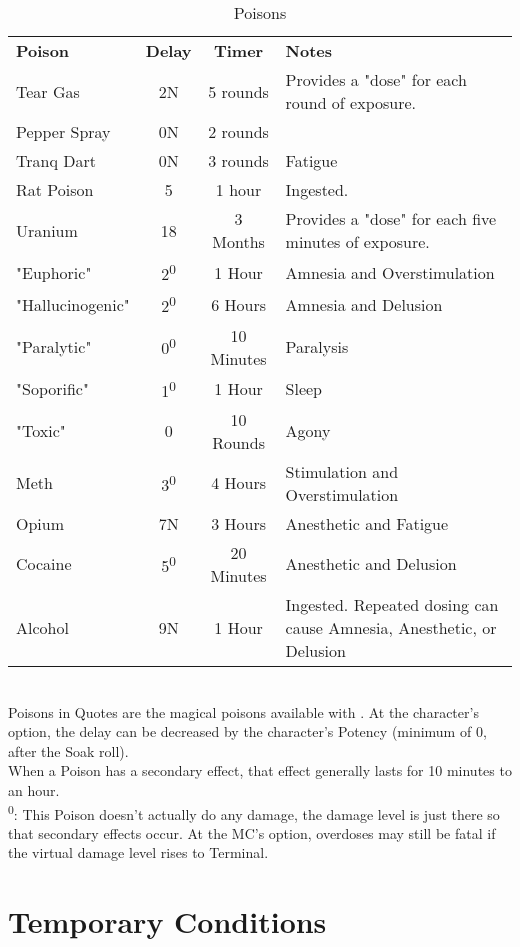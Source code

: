 \begin{table}[htb] 
\caption{Poisons} \raggedright
\begin{tabular}{l c c p{8cm}}
\textbf{Poison} & \textbf{Delay} & \textbf{Timer} & \textbf{Notes}\\
Tear Gas & 2N & 5 rounds & Provides a "dose" for each round of exposure.\\
Pepper Spray & 0N & 2 rounds & \\
Tranq Dart & 0N & 3 rounds & Fatigue\\
Rat Poison & 5 & 1 hour & Ingested.\\
Uranium & 18 & 3 Months & Provides a "dose" for each five minutes of exposure.\\
"Euphoric" & 2\textsuperscript{0} & 1 Hour & Amnesia and Overstimulation\\
"Hallucinogenic" & 2\textsuperscript{0} & 6 Hours & Amnesia and Delusion\\
"Paralytic" & 0\textsuperscript{0} & 10 Minutes & Paralysis\\
"Soporific" & 1\textsuperscript{0} & 1 Hour & Sleep\\
"Toxic" & 0 & 10 Rounds & Agony\\
Meth & 3\textsuperscript{0} & 4 Hours & Stimulation and Overstimulation\\
Opium & 7N & 3 Hours & Anesthetic and Fatigue\\
Cocaine & 5\textsuperscript{0} & 20 Minutes & Anesthetic and Delusion\\
Alcohol & 9N & 1 Hour & Ingested. Repeated dosing can cause Amnesia, Anesthetic, or Delusion\\
\end{tabular}\\
\textbullet{}Poisons in Quotes are the magical poisons available with . At the character's option, the delay can be decreased by the character's Potency (minimum of 0, after the Soak roll).\\
\textbullet{}When a Poison has a secondary effect, that effect generally lasts for 10 minutes to an hour.\\
\textsuperscript{0}: This Poison doesn't actually do any damage, the damage level is just there so that secondary effects occur. At the MC's option, overdoses may still be fatal if the virtual damage level rises to Terminal.
\end{table}

\section{Temporary Conditions}

